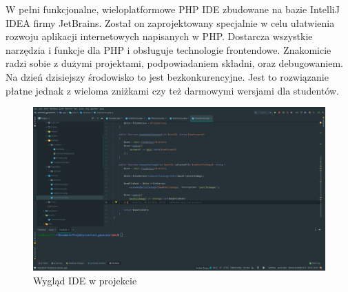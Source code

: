 W pełni funkcjonalne, wieloplatformowe PHP IDE zbudowane na bazie IntelliJ IDEA firmy JetBrains. Został on zaprojektowany specjalnie w celu ułatwienia rozwoju aplikacji internetowych napisanych w PHP. Dostarcza wszystkie narzędzia i funkcje dla PHP i obsługuje technologie frontendowe.
Znakomicie radzi sobie z dużymi projektami, podpowiadaniem składni, oraz debugowaniem.
Na dzień dzisiejszy środowisko to jest bezkonkurencyjne. Jest to rozwiązanie płatne jednak z wieloma zniżkami czy też darmowymi wersjami dla studentów.

\begin{figure}[H]
    \centering
    \includegraphics[width=6in]{images/phpstorm.png}
    \caption{Wygląd IDE  w projekcie \label{fig:phpstorm}}
\end{figure}